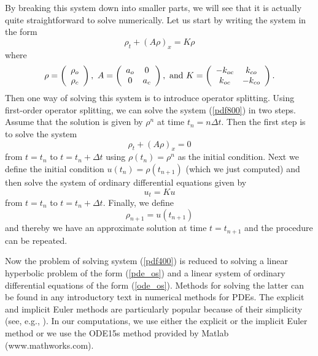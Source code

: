 By breaking this system down into smaller parts, we will see that it
is actually quite straightforward to solve numerically. Let us start by
writing the system in the form%
\begin{equation}
\rho_{t}+(A\rho)_{x}=K\rho \label{pdf800}
\end{equation}
where%
\begin{equation}
\rho=\left(
\begin{array}
[c]{c}%
\rho_{o}\\
\rho_{c}%
\end{array}
\right)  ,\text{ }A=\left(
\begin{array}
[c]{cc}%
a_{o} & 0\\
0 & a_{c}%
\end{array}
\right)  ,\text{ and }K=\left(
\begin{array}
[c]{cc}%
-k_{oc} & k_{co}\\
k_{oc} & -k_{co}%
\end{array}
\right)  .
\end{equation}
Then one way of solving this system is to introduce operator splitting. Using
first-order operator splitting, we can solve the system (\ref{pdf800}) in two steps.
Assume that the solution is given by $\rho^{n}$ at time $t_{n}=n\Delta t.$
Then the first step is to solve the system%
\begin{equation}
\rho_{t}+(A\rho)_{x}=0\label{pde_os}%
\end{equation}
from $t=t_{n}$ to $t=t_{n}+\Delta t$ using $\rho(t_{n})=\rho^{n}$ as the
initial condition. Next we define the initial condition $u(t_{n})=\rho
(t_{n+1})$ (which we just computed) and then solve the system of ordinary
differential equations given by%
\begin{equation}
u_{t}=Ku\label{ode_os}%
\end{equation}
from $t=t_{n}$ to $t=t_{n}+\Delta t$.
Finally, we define%
\begin{equation}
\rho_{n+1}=u(t_{n+1})
\end{equation}
and thereby we have an approximate solution at time $t=t_{n+1}$ and the 
procedure can be repeated. 

\bigskip 
Now the problem of solving system (\ref{pdf400}) is reduced to solving a
linear hyperbolic problem of the form (\ref{pde_os}) and a linear system of ordinary
differential equations of the form (\ref{ode_os}). Methods for solving the latter can be
found in any introductory text in numerical methods for PDEs. The explicit and implicit Euler methods are particularly popular
because of their simplicity (see, e.g., \cite{Tveito2010}). In our computations, we use either
the explicit or the implicit Euler method or we use the ODE15s method provided by Matlab (www.mathworks.com). 


